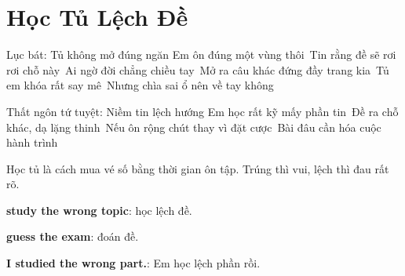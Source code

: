 \chapter{Học Tủ Lệch Đề}

\begin{lucbatbox}{Lục bát: Tủ không mở đúng ngăn}
Em ôn đúng một vùng thôi\
Tin rằng đề sẽ rơi rơi chỗ này\
Ai ngờ đời chẳng chiều tay\
Mở ra câu khác đứng đầy trang kia\
Tủ em khóa rất say mê\
Nhưng chìa sai ổ nên về tay không
\end{lucbatbox}

\begin{tutuyetbox}{Thất ngôn tứ tuyệt: Niềm tin lệch hướng}
Em học rất kỹ mấy phần tin\
Đề ra chỗ khác, dạ lặng thinh\
Nếu ôn rộng chút thay vì đặt cược\
Bài đâu cần hóa cuộc hành trình
\end{tutuyetbox}

\begin{ghichu}
Học tủ là cách mua vé số bằng thời gian ôn tập. Trúng thì vui, lệch thì đau rất rõ.
\end{ghichu}

\begin{englishnote}
\textbf{study the wrong topic}: học lệch đề.\par
\textbf{guess the exam}: đoán đề.\par
\textbf{I studied the wrong part.}: Em học lệch phần rồi.
\end{englishnote}